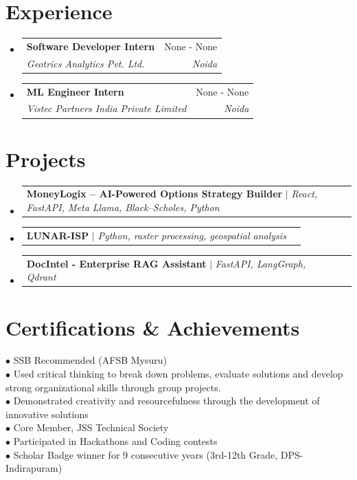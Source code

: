 \documentclass[letterpaper,10pt]{article}
\makeatletter
\newcommand{\resumeSubheading}[4]{
  \vspace{-2pt}\item
    \begin{tabular*}{0.97\textwidth}[t]{l@{\extracolsep{\fill}}r}
      \textbf{#1} & #2 \\
      \textit{\small#3} & \textit{\small #4} \\
    \end{tabular*}\vspace{-7pt}
}
\newcommand{\resumeProjectHeading}[2]{
    \item
    \begin{tabular*}{0.97\textwidth}{l@{\extracolsep{\fill}}r}
      \small#1 & #2 \\
    \end{tabular*}\vspace{-7pt}
}
\newcommand{\resumeSubHeadingListStart}{\begin{itemize}[leftmargin=0.15in, label={}]}
\newcommand{\resumeSubHeadingListEnd}{\end{itemize}}
\newcommand{\resumeItemListStart}{\begin{itemize}}
\newcommand{\resumeItemListEnd}{\end{itemize}\vspace{-5pt}}
\makeatother
\begin{document}
\section{Experience}
  \resumeSubHeadingListStart
          \resumeSubheading
        {Software Developer Intern}{None - None}
        {Geotrics Analytics Pvt. Ltd.}{Noida}
        \resumeItemListStart
                  \resumeItemListEnd
          \resumeSubheading
        {ML Engineer Intern}{None - None}
        {Vistec Partners India Private Limited}{Noida}
        \resumeItemListStart
                  \resumeItemListEnd
      \resumeSubHeadingListEnd

\section{Projects}
    \resumeSubHeadingListStart
              \resumeProjectHeading
          {\textbf{MoneyLogix – AI-Powered Options Strategy Builder} $|$ \emph{React, FastAPI, Meta Llama, Black–Scholes, Python}}{}
          \resumeItemListStart
                      \resumeItemListEnd
              \resumeProjectHeading
          {\textbf{LUNAR-ISP} $|$ \emph{Python, raster processing, geospatial analysis}}{}
          \resumeItemListStart
                      \resumeItemListEnd
              \resumeProjectHeading
          {\textbf{DocIntel - Enterprise RAG Assistant} $|$ \emph{FastAPI, LangGraph, Qdrant}}{}
          \resumeItemListStart
                      \resumeItemListEnd
          \resumeSubHeadingListEnd

\section{Certifications \& Achievements}
  \begin{itemize}[leftmargin=0.15in, label={}]
    \small{\item{
                    $\bullet$ SSB Recommended (AFSB Mysuru) \\
              $\bullet$ Used critical thinking to break down problems, evaluate solutions and develop strong organizational skills through group projects. \\
              $\bullet$ Demonstrated creativity and resourcefulness through the development of innovative solutions \\
              $\bullet$ Core Member, JSS Technical Society \\
              $\bullet$ Participated in Hackathons and Coding contests \\
              $\bullet$ Scholar Badge winner for 9 consecutive years (3rd-12th Grade, DPS-Indirapuram) \\
          }}
  \end{itemize}
\end{document}
